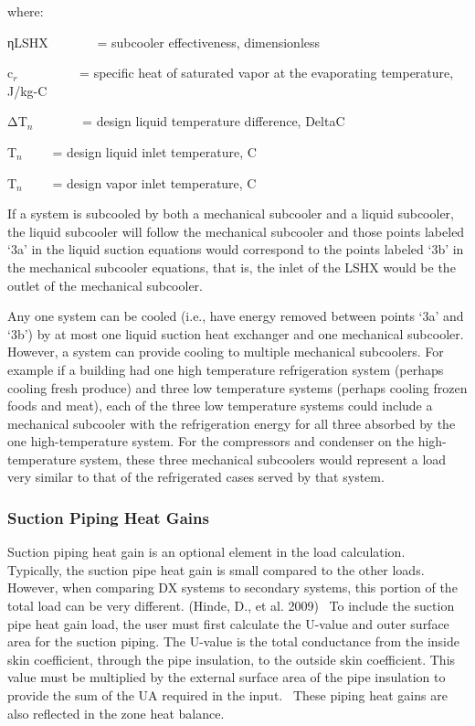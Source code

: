 where:

ηLSHX~~~~~~~ = subcooler effectiveness, dimensionless

c\(_{r}\)~~~~~~~~~ = specific heat of saturated vapor at the evaporating temperature, J/kg-C

ΔT\(_{n}\)~~~~~~~ = design liquid temperature difference, DeltaC

T\(_{n}\)~~~~ = design liquid inlet temperature, C

T\(_{n}\)~~~~ = design vapor inlet temperature, C

If a system is subcooled by both a mechanical subcooler and a liquid subcooler, the liquid subcooler will follow the mechanical subcooler and those points labeled `3a' in the liquid suction equations would correspond to the points labeled `3b' in the mechanical subcooler equations, that is, the inlet of the LSHX would be the outlet of the mechanical subcooler.

Any one system can be cooled (i.e., have energy removed between points `3a' and `3b') by at most one liquid suction heat exchanger and one mechanical subcooler. However, a system can provide cooling to multiple mechanical subcoolers. For example if a building had one high temperature refrigeration system (perhaps cooling fresh produce) and three low temperature systems (perhaps cooling frozen foods and meat), each of the three low temperature systems could include a mechanical subcooler with the refrigeration energy for all three absorbed by the one high-temperature system. For the compressors and condenser on the high-temperature system, these three mechanical subcoolers would represent a load very similar to that of the refrigerated cases served by that system.

\subsubsection{Suction Piping Heat Gains}\label{suction-piping-heat-gains}

Suction piping heat gain is an optional element in the load calculation.~ Typically, the suction pipe heat gain is small compared to the other loads.~ However, when comparing DX systems to secondary systems, this portion of the total load can be very different. (Hinde, D., et al. 2009) ~To include the suction pipe heat gain load, the user must first calculate the U-value and outer surface area for the suction piping. The U-value is the total conductance from the inside skin coefficient, through the pipe insulation, to the outside skin coefficient. This value must be multiplied by the external surface area of the pipe insulation to provide the sum of the UA required in the input.~ These piping heat gains are also reflected in the zone heat balance.

